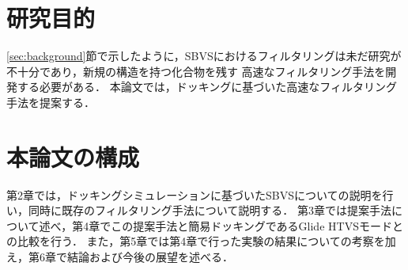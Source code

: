 
\section{研究目的}
\ref{sec:background}節で示したように，SBVSにおけるフィルタリングは未だ研究が不十分であり，新規の構造を持つ化合物を残す
高速なフィルタリング手法を開発する必要がある．
本論文では，ドッキングに基づいた高速なフィルタリング手法を提案する．

\section{本論文の構成}
第2章では，ドッキングシミュレーションに基づいたSBVSについての説明を行い，同時に既存のフィルタリング手法について説明する．
第3章では提案手法について述べ，第4章でこの提案手法と簡易ドッキングであるGlide HTVSモードとの比較を行う．
また，第5章では第4章で行った実験の結果についての考察を加え，第6章で結論および今後の展望を述べる．